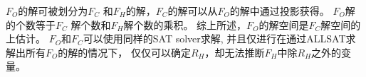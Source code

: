 %
%
$F_O$的解可被划分为$F_C$ 和$F_H$的解，$F_C$的解可以从$F_O$的解中通过投影获得。
$F_O$解的个数等于$F_C$ 解个数和$F_H$解个数的乘积。
%
%
综上所述，$F_O$的解空间是$F_C$解空间的上估计。
$F_O$和$F_C$可以使用同样的SAT solver求解,
并且仅进行在通过ALLSAT求解出所有$F_O$的解的情况下，
仅仅可以确定$R_H$，却无法推断$F_H$中除$R_H$之外的变量。

%
%

